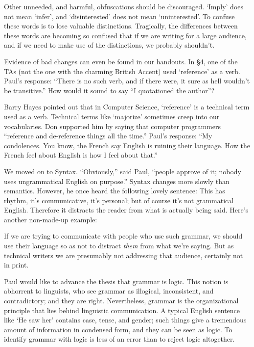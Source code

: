 Other 
unneeded, and  harmful,  obfuscations should be discouraged.
`Imply' does not mean `infer', and `disinterested' does not mean
`uninterested'.  To confuse these words is to lose valuable distinctions.
Tragically, the differences between these words are becoming so confused
that if we are writing for a large audience, and if we need to make use of
the distinctions, we probably shouldn't.

Evidence of bad changes can even be found in our handouts.  In \S4,
one of the TAs (not the one with the charming British Accent) used
`reference' as a verb.  Paul's response: ``There is no such verb, and if
there were, it sure as hell wouldn't be transitive.''
How would it sound to say ``I quotationed the author''?

Barry Hayes pointed out that in Computer Science, `reference' is a technical
term  used as a verb. Technical terms like `majorize' sometimes
creep into our vocabularies. Don supported him by saying that computer programmers
``reference and de-reference things all the time.''  Paul's response: ``My
condolences.  You know, the French say English is ruining their language.
How the French feel about English is how I feel about that.''

We moved on to Syntax.
``Obviously,'' said Paul, ``people approve of it; nobody uses ungrammatical
English on purpose.'' Syntax changes more slowly than semantics.
However, he once heard the following lovely sentence:
\nobreak\smallskip
{}
This has rhythm, it's communicative, it's personal; but of course it's not
grammatical English. Therefore it distracts the reader from what is
actually being said. Here's another non-made-up example:
\par\nobreak\smallskip
{}
If we are trying to communicate with people who use such grammar, we
should use their language so as not to distract {\it them\/} from what we're
saying. But as technical writers we are presumably not addressing that
audience, certainly not in print.

Paul would
like to advance the thesis that grammar is logic.  This notion is abhorrent
to linguists, who see grammar as illogical, inconsistent, and contradictory;
and they are right. Nevertheless, grammar is the organizational principle
that lies behind linguistic communication. A typical English sentence
like `He saw her' contains case, tense, and gender; such things give
a tremendous amount of information in condensed form, and they can
be seen as logic. To identify grammar with logic is less of an error
than to reject logic altogether.

